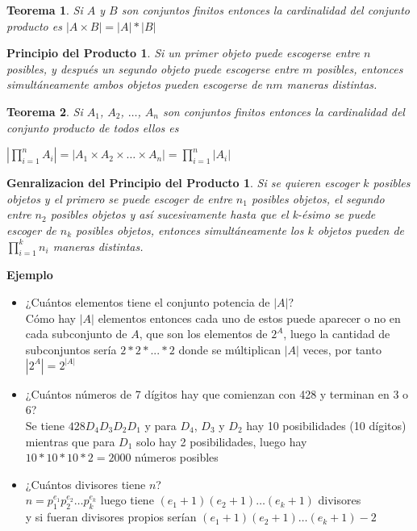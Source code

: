\documentclass[a4paper,12pt]{report}
\newtheorem*{ppr}{Principio del Producto}
\newtheorem*{gppr}{Genralizacion del Principio del Producto}
\newtheorem*{teo}{Teorema}
\begin{document}
\begin{teo}
 Si $A$ y $B$ son conjuntos finitos entonces la cardinalidad del conjunto producto es $|A\times B|=|A|*|B|$
\end{teo}


\begin{ppr}
 Si un primer objeto puede escogerse entre $n$ posibles, y después un segundo objeto puede escogerse entre $m$ posibles, entonces simultáneamente ambos objetos pueden escogerse de
 $nm$ maneras distintas.
\end{ppr}

\begin{teo}
 Si $A_1$, $A_2$, $\dots$, $A_n$ son conjuntos finitos entonces la cardinalidad del conjunto producto de todos ellos es 
 
 $|\prod^n_{i=1}A_i|=|A_1\times A_2\times \dots\times A_n|=\prod^n_{i=1}|A_i|$
\end{teo}

\begin{gppr}
 Si se quieren escoger $k$ posibles objetos y el primero se puede escoger de entre $n_1$ posibles objetos, el segundo entre $n_2$ posibles objetos y así sucesivamente hasta que el k-ésimo se puede escoger de $n_k$ posibles objetos, entonces simultáneamente los $k$ objetos pueden de $\prod^k_{i=1}n_i$ maneras distintas.
\end{gppr}


\textbf{Ejemplo}

\begin{itemize}
 \item ¿Cuántos elementos tiene el conjunto potencia de $|A|$? \\
 Cómo hay $|A|$ elementos entonces cada uno de estos puede aparecer o no en cada subconjunto de $A$, que son los elementos de $2^A$, luego la cantidad de subconjuntos sería $2*2*...*2$ donde se múltiplican $|A|$ veces, por tanto $|2^A|=2^{|A|}$
 
 \item ¿Cuántos números de 7 dígitos hay que comienzan con 428 y terminan en 3 o 6?\\
  Se tiene $428D_4D_3D_2D_1$ y para $D_4$, $D_3$ y $D_2$ hay 10 posibilidades (10 dígitos) mientras que para $D_1$ solo hay 2 posibilidades, luego hay\\ 
 $10*10*10*2=2000$ números posibles
 
 \item ¿Cuántos divisores tiene $n$?\\
 $n=p^{e_1}_1 p^{e_2}_2 \dots p^{e_k}_k$ luego tiene $(e_1+1)(e_2+1)\dots(e_k+1)$ divisores\\
 y si fueran divisores propios serían $(e_1+1)(e_2+1)\dots(e_k+1)-2$ 
 
\end{itemize}
\end{document}
